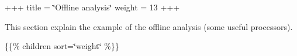 +++ title = \char`\"{}\+Offline analysis\char`\"{} weight = 13 +++

This section explain the example of the offline analysis (some useful processors).

\{\{\% children sort=\char`\"{}weight\char`\"{} \%\}\} 